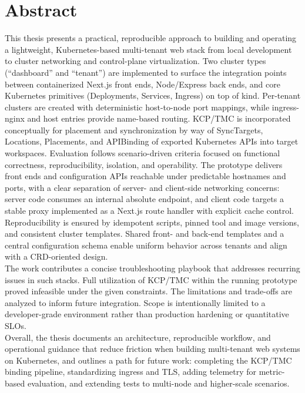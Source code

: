 \documentclass[11pt, a4paper, oneside, listof=totoc]{scrartcl}
\begin{document}
    \section*{Abstract}\label{abstract}
        This thesis presents a practical, reproducible approach to building and operating a
        lightweight, Kubernetes-based multi-tenant web stack from local development to cluster
        networking and control-plane virtualization.
        Two cluster types (\enquote{dashboard} and \enquote{tenant}) are implemented to surface the
        integration points between containerized Next.js front ends, Node/Express back ends, and
        core Kubernetes primitives (Deployments, Services, Ingress) on top of kind.
        Per-tenant clusters are created with deterministic host-to-node port mappings, while
        ingress-nginx and host entries provide name-based routing.
        KCP/TMC is incorporated conceptually for placement and synchronization by way of
        SyncTargets, Locations, Placements, and APIBinding of exported Kubernetes APIs into target
        workspaces.
        Evaluation follows scenario-driven criteria focused on functional correctness,
        reproducibility, isolation, and operability.
        The prototype delivers front ends and configuration APIs reachable under predictable
        hostnames and ports, with a clear separation of server- and client-side networking concerns:
        server code consumes an internal absolute endpoint, and client code targets a stable proxy
        implemented as a Next.js route handler with explicit cache control.
        Reproducibility is ensured by idempotent scripts, pinned tool and image versions, and
        consistent cluster templates.
        Shared front- and back-end templates and a central configuration schema enable uniform
        behavior across tenants and align with a CRD-oriented design.\\
        The work contributes a concise troubleshooting playbook that addresses recurring issues in
        such stacks.
        Full utilization of KCP/TMC within the running prototype proved infeasible under the given
        constraints.
        The limitations and trade-offs are analyzed to inform future integration.
        Scope is intentionally limited to a developer-grade environment rather than production
        hardening or quantitative SLOs.\\
        Overall, the thesis documents an architecture, reproducible workflow, and operational
        guidance that reduce friction when building multi-tenant web systems on Kubernetes, and
        outlines a path for future work: completing the KCP/TMC binding pipeline, standardizing
        ingress and TLS, adding telemetry for metric-based evaluation, and extending tests to
        multi-node and higher-scale scenarios.
\end{document}

